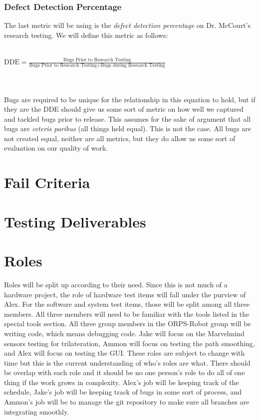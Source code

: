 \documentclass[english,12pt]{article}
\begin{document}
\subsubsection{Defect Detection Percentage}
The last metric will be using is the \textit{defect detection percentage} on Dr. McCourt's 
research testing. We will define this metric as follows:\\\\
\centerline{$\text{DDE} = \frac{\text{Bugs Prior to Research Testing}}{\text{Bugs Prior to Research Testing} + \text{Bugs during Research Testing}}$}
\\\\
Bugs are required to be unique for the relationship in this equation to hold, but if they are the DDE should 
give us some sort of metric on how well we captured and tackled bugs prior to release. This 
assumes for the sake of argument that all bugs are \textit{ceteris paribus} (all things held equal).
This is not the case. All bugs are not created equal, neither are all metrics, but they do 
allow us some sort of evaluation on our quality of work.
\section{Fail Criteria}

\section{Testing Deliverables}

\section{Roles}
Roles will be split up according to their need. Since this is not much of a hardware project, 
the role of hardware test items will fall under the purview of Alex. For the software and 
system test items, those will be split among all three members. All three members will need to 
be familiar with the tools listed in the special tools section. All three group members in the 
ORPS-Robot group will be writing code, which means debugging code. Jake will focus on the 
Marvelmind sensors testing for trilateration, Ammon will focus on testing the path smoothing, 
and Alex will focus on testing the GUI. These roles are subject to change with time but this is 
the current understanding of who's roles are what. There should be overlap with each role and 
it should be no one person's role to do all of one thing if the work grows in complexity. Alex's 
job will be keeping track of the schedule, Jake's job will be keeping track of bugs in some sort of 
process, and Ammon's job will be to manage the git repository to make sure all branches are integrating 
smoothly.
\end{document}
